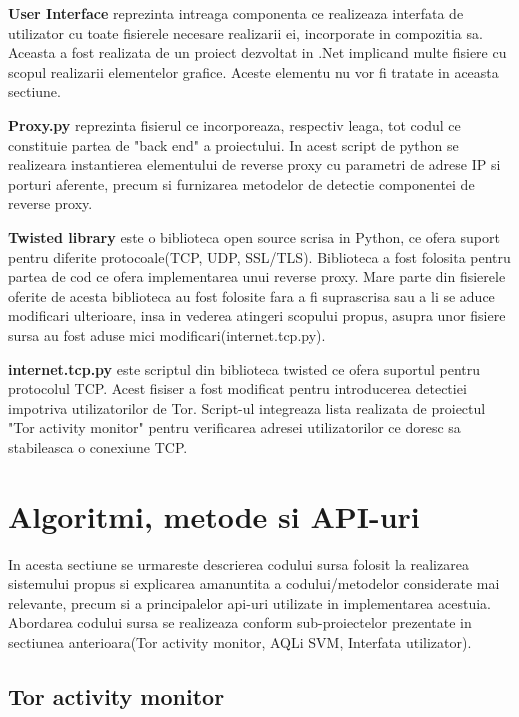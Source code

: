 \textbf{User Interface} reprezinta intreaga componenta ce realizeaza interfata de utilizator cu toate fisierele necesare realizarii ei, incorporate in compozitia sa. Aceasta a fost realizata de un proiect dezvoltat in .Net implicand multe fisiere cu scopul realizarii elementelor grafice. Aceste elementu nu vor fi tratate in aceasta sectiune.

\textbf{Proxy.py} reprezinta fisierul ce incorporeaza, respectiv leaga, tot codul ce constituie partea de "back end" a proiectului. In acest script de python se realizeara instantierea elementului de reverse proxy cu parametri de adrese IP si porturi aferente, precum si furnizarea metodelor de detectie componentei de reverse proxy.

\textbf{Twisted library} este o biblioteca open source scrisa in Python, ce ofera suport pentru diferite protocoale(TCP, UDP, SSL/TLS). Biblioteca a fost folosita pentru partea de cod ce ofera implementarea unui reverse proxy. Mare parte din fisierele oferite de acesta biblioteca au fost folosite fara a fi suprascrisa sau a li se aduce modificari ulterioare, insa in vederea atingeri scopului propus, asupra unor fisiere sursa au fost aduse mici modificari(internet.tcp.py).

\textbf{internet.tcp.py} este scriptul din biblioteca twisted ce ofera suportul pentru protocolul TCP. Acest fisiser a fost modificat pentru introducerea detectiei impotriva utilizatorilor de Tor. Script-ul integreaza lista realizata de proiectul "Tor activity monitor" pentru verificarea adresei utilizatorilor ce doresc sa stabileasca o conexiune TCP.




\section{Algoritmi, metode si API-uri}

In acesta sectiune se urmareste descrierea codului sursa folosit la realizarea sistemului propus si explicarea amanuntita a codului/metodelor considerate mai relevante, precum si a principalelor api-uri utilizate in implementarea acestuia. Abordarea codului sursa se realizeaza conform sub-proiectelor prezentate in sectiunea anterioara(Tor activity monitor, AQLi SVM, Interfata utilizator).

\subsection{Tor activity monitor}

